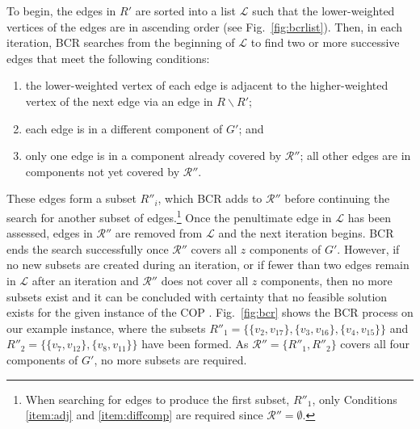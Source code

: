 \documentclass[a4paper,11pt,authoryear]{elsarticle}
\begin{document}
To begin, the edges in $R'$ are sorted into a list $\mathcal{L}$ such that the lower-weighted vertices of the edges are in ascending order (see Fig.~\ref{fig:bcrlist}). Then, in each iteration, BCR searches from the beginning of $\mathcal{L}$ to find two or more successive edges that meet the following conditions:
\begin{enumerate}[label={(\roman*)},itemsep=-0.2em]
	\item the lower-weighted vertex of each edge is adjacent to the higher-weighted vertex of the next edge via an edge in $R\backslash R'$;\label{item:adj}
	\item each edge is in a different component of $G'$; \label{item:diffcomp} and
	\item only one edge is in a component already covered by $\mathcal{R}''$; all other edges are in components not yet covered by $\mathcal{R}''$.\label{item:overlap}
\end{enumerate} 
These edges form a subset $R''_i$, which BCR adds to $\mathcal{R}''$ before continuing the search for another subset of edges.\footnote{When searching for edges to produce the first subset, $R''_1$, only Conditions \ref{item:adj} and \ref{item:diffcomp} are required since $\mathcal{R}'' = \emptyset$.} Once the penultimate edge in $\mathcal{L}$ has been assessed, edges in $\mathcal{R}''$ are removed from $\mathcal{L}$ and the next iteration begins. BCR ends the search successfully once $\mathcal{R}''$ covers all $z$ components of $G'$. However, if no new subsets are created during an iteration, or if fewer than two edges remain in $\mathcal{L}$ after an iteration and $\mathcal{R}''$ does not cover all $z$ components, then no more subsets exist and it can be concluded with certainty that no feasible solution exists for the given instance of the COP \citep{hawa2020t}. Fig.~\ref{fig:bcr} shows the BCR process on our example instance, where the subsets $R''_1 = \{\{v_2, v_{17}\},\{v_3, v_{16}\}, \{v_4, v_{15}\}\}$ and $R''_2 = \{\{v_7, v_{12}\}, \{v_8, v_{11}\}\}$ have been formed. As $\mathcal{R}'' =\{R''_1, R''_2\}$ covers all four components of $G'$, no more subsets are required.
\end{document}
